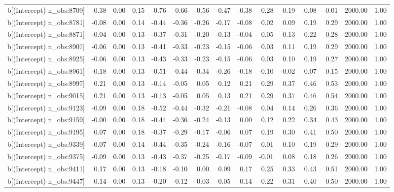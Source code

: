 \begin{table}[ht]
\begin{tabular}{rrrrrrrrrrrrrrr}
  b[(Intercept) n\_obs:8709] & -0.38 & 0.00 & 0.15 & -0.76 & -0.66 & -0.56 & -0.47 & -0.38 & -0.28 & -0.19 & -0.08 & -0.01 & 2000.00 & 1.00 \\ 
  b[(Intercept) n\_obs:8781] & -0.08 & 0.00 & 0.14 & -0.44 & -0.36 & -0.26 & -0.17 & -0.08 & 0.02 & 0.09 & 0.19 & 0.29 & 2000.00 & 1.00 \\ 
  b[(Intercept) n\_obs:8871] & -0.04 & 0.00 & 0.13 & -0.37 & -0.31 & -0.20 & -0.13 & -0.04 & 0.05 & 0.13 & 0.22 & 0.28 & 2000.00 & 1.00 \\ 
  b[(Intercept) n\_obs:8907] & -0.06 & 0.00 & 0.13 & -0.41 & -0.33 & -0.23 & -0.15 & -0.06 & 0.03 & 0.11 & 0.19 & 0.29 & 2000.00 & 1.00 \\ 
  b[(Intercept) n\_obs:8925] & -0.06 & 0.00 & 0.13 & -0.43 & -0.33 & -0.23 & -0.15 & -0.06 & 0.03 & 0.10 & 0.19 & 0.27 & 2000.00 & 1.00 \\ 
  b[(Intercept) n\_obs:8961] & -0.18 & 0.00 & 0.13 & -0.51 & -0.44 & -0.34 & -0.26 & -0.18 & -0.10 & -0.02 & 0.07 & 0.15 & 2000.00 & 1.00 \\ 
  b[(Intercept) n\_obs:8997] & 0.21 & 0.00 & 0.13 & -0.14 & -0.05 & 0.05 & 0.12 & 0.21 & 0.29 & 0.37 & 0.46 & 0.53 & 2000.00 & 1.00 \\ 
  b[(Intercept) n\_obs:9015] & 0.21 & 0.00 & 0.13 & -0.13 & -0.05 & 0.05 & 0.13 & 0.21 & 0.29 & 0.37 & 0.46 & 0.54 & 2000.00 & 1.00 \\ 
  b[(Intercept) n\_obs:9123] & -0.09 & 0.00 & 0.18 & -0.52 & -0.44 & -0.32 & -0.21 & -0.08 & 0.04 & 0.14 & 0.26 & 0.36 & 2000.00 & 1.00 \\ 
  b[(Intercept) n\_obs:9159] & -0.00 & 0.00 & 0.18 & -0.44 & -0.36 & -0.24 & -0.13 & 0.00 & 0.12 & 0.22 & 0.34 & 0.43 & 2000.00 & 1.00 \\ 
  b[(Intercept) n\_obs:9195] & 0.07 & 0.00 & 0.18 & -0.37 & -0.29 & -0.17 & -0.06 & 0.07 & 0.19 & 0.30 & 0.41 & 0.50 & 2000.00 & 1.00 \\ 
  b[(Intercept) n\_obs:9339] & -0.07 & 0.00 & 0.14 & -0.44 & -0.35 & -0.24 & -0.16 & -0.07 & 0.01 & 0.10 & 0.19 & 0.29 & 2000.00 & 1.00 \\ 
  b[(Intercept) n\_obs:9375] & -0.09 & 0.00 & 0.13 & -0.43 & -0.37 & -0.25 & -0.17 & -0.09 & -0.01 & 0.08 & 0.18 & 0.26 & 2000.00 & 1.00 \\ 
  b[(Intercept) n\_obs:9411] & 0.17 & 0.00 & 0.13 & -0.18 & -0.10 & 0.00 & 0.09 & 0.17 & 0.25 & 0.33 & 0.43 & 0.51 & 2000.00 & 1.00 \\ 
  b[(Intercept) n\_obs:9447] & 0.14 & 0.00 & 0.13 & -0.20 & -0.12 & -0.03 & 0.05 & 0.14 & 0.22 & 0.31 & 0.40 & 0.50 & 2000.00 & 1.00 \\ 

\end{tabular}
\end{table}
